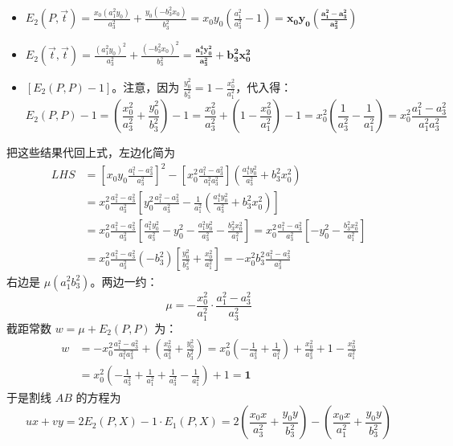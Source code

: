 \begin{solution}
\begin{itemize}
\item $\displaystyle E_2(P,\vec{t}) = \frac{x_0(a_1^2 y_0)}{a_3^2} + \frac{y_0(-b_3^2 x_0)}{b_3^2} = x_0 y_0 \left(\frac{a_1^2}{a_3^2} - 1\right) = \mathbf{x_0 y_0 \left(\frac{a_1^2 - a_3^2}{a_3^2}\right)}$
\item $\displaystyle E_2(\vec{t},\vec{t}) = \frac{(a_1^2 y_0)^2}{a_3^2} + \frac{(-b_3^2 x_0)^2}{b_3^2} = \mathbf{\frac{a_1^4 y_0^2}{a_3^2} + b_3^2 x_0^2}$
\item $[E_2(P,P) - 1]$。注意，因为 $\frac{y_0^2}{b_3^2} = 1 - \frac{x_0^2}{a_1^2}$，代入得：
\[E_2(P,P) - 1 = \left(\frac{x_0^2}{a_3^2} + \frac{y_0^2}{b_3^2}\right) - 1 = \frac{x_0^2}{a_3^2} + \left(1 - \frac{x_0^2}{a_1^2}\right) - 1 = x_0^2 \left(\frac{1}{a_3^2} - \frac{1}{a_1^2}\right) = {x_0^2 \frac{a_1^2 - a_3^2}{a_1^2 a_3^2}}\]
\end{itemize}
把这些结果代回上式，左边化简为
\begin{align*}
LHS &=\left[ x_0 y_0 \frac{a_1^2 - a_3^2}{a_3^2} \right]^2 - \left[ x_0^2 \frac{a_1^2 - a_3^2}{a_1^2 a_3^2} \right] \left( \frac{a_1^4 y_0^2}{a_3^2} + b_3^2 x_0^2 \right)\\
&= x_0^2 \frac{a_1^2 - a_3^2}{a_3^2} \left[ y_0^2 \frac{a_1^2 - a_3^2}{a_3^2} - \frac{1}{a_1^2} \left( \frac{a_1^4 y_0^2}{a_3^2} + b_3^2 x_0^2 \right) \right]\\
&= x_0^2 \frac{a_1^2 - a_3^2}{a_3^2}\left[ \frac{a_1^2 y_0^2}{a_3^2} - y_0^2 - \frac{a_1^2 y_0^2}{a_3^2} - \frac{b_3^2 x_0^2}{a_1^2} \right]=x_0^2 \frac{a_1^2 - a_3^2}{a_3^2}\left[ - y_0^2 - \frac{b_3^2 x_0^2}{a_1^2}\right]\\
&= x_0^2 \frac{a_1^2 - a_3^2}{a_3^2}(-b_3^2)\left[\frac{y_0^2}{b_3^2} + \frac{x_0^2}{a_1^2} \right]=- x_0^2 b_3^2 \frac{a_1^2 - a_3^2}{a_3^2}
\end{align*}
右边是 $\mu (a_1^2 b_3^2)$。两边一约：
$$\mu = - \frac{x_0^2}{a_1^2} \cdot \frac{a_1^2 - a_3^2}{a_3^2}$$
截距常数 $w = \mu + E_2(P,P)$ 为：
\begin{align*}
w &= - x_0^2 \frac{a_1^2 - a_3^2}{a_1^2 a_3^2} + \left(\frac{x_0^2}{a_3^2} + \frac{y_0^2}{b_3^2}\right)= x_0^2 \left( - \frac{1}{a_3^2} + \frac{1}{a_1^2} \right) + \frac{x_0^2}{a_3^2} + 1 - \frac{x_0^2}{a_1^2}\\
&= x_0^2 \left( -\frac{1}{a_3^2} + \frac{1}{a_1^2} + \frac{1}{a_3^2} - \frac{1}{a_1^2} \right) + 1 = \mathbf{1}
\end{align*}
于是割线 $AB$ 的方程为
\[ux + vy = 2E_2(P,X) - 1 \cdot E_1(P,X)= 2\left(\frac{x_0 x}{a_3^2} + \frac{y_0 y}{b_3^2}\right) - \left(\frac{x_0 x}{a_1^2} + \frac{y_0 y}{b_3^2}\right)\]

\end{solution}
